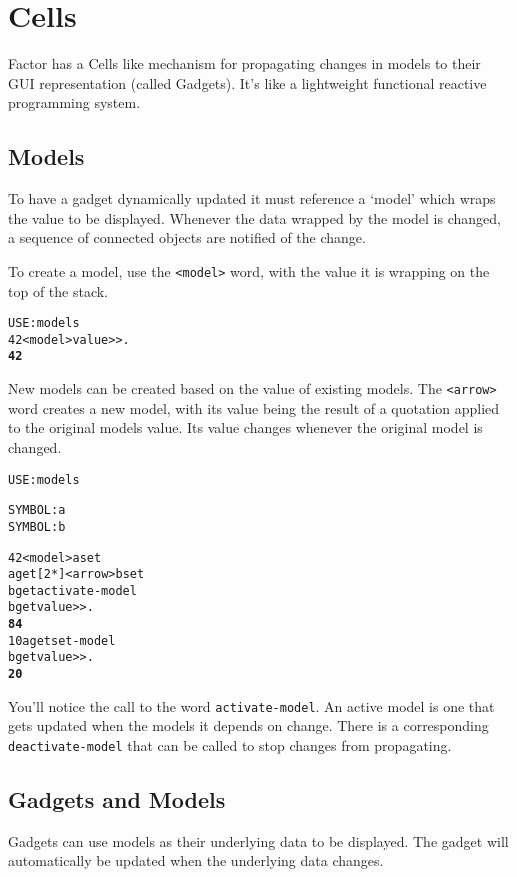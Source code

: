 \chapter{Cells}\label{cells}

Factor has a Cells like mechanism for propagating changes in models to
their GUI representation (called Gadgets). It's like a lightweight
functional reactive programming system. 

\section{Models}
To have a gadget dynamically updated it must reference a `model' which
wraps the value to be displayed. Whenever the data wrapped by the
model is changed, a sequence of connected objects are notified of the
change.  

To create a model, use the \verb|<model>| word, with the value it is wrapping
on the top of the stack.

\begin{alltt}
USE: models
42 <model> value>> .
  \textbf{42}
\end{alltt}

New models can be created based on the value of existing models. The \verb|<arrow>| word creates a new model, with its value being the result of a quotation applied to the original models value. Its value changes whenever the original model is changed.
\begin{alltt}
USE: models

SYMBOL: a
SYMBOL: b

42 <model> a set
a get [ 2 * ] <arrow> b set
b get activate-model
b get value>> .
  \textbf{84}
10 a get set-model
b get value>> .
  \textbf{20}
\end{alltt}
You'll notice the call to the word \verb|activate-model|. An active model is one that gets updated when the models it depends on change. There is a corresponding \verb|deactivate-model| that can be called to stop changes from propagating.



\section{Gadgets and Models}
Gadgets can use models as their underlying data to be displayed. The gadget will automatically be updated when the underlying data changes. 

